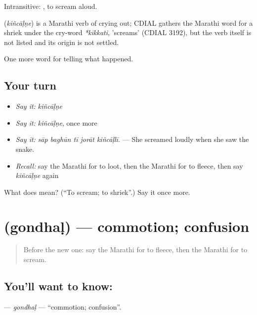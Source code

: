 Intransitive:  , to scream aloud.

\begin{cousinweb}
\textbf{} (\emph{kiñcāḷṇe}) is a Marathi verb of crying out; CDIAL gathers the Marathi word for a shriek under the cry-word \emph{*kīkkati}, 'screams' (CDIAL 3192), but the verb itself is not listed and its origin is not settled.
\end{cousinweb}

\begin{grammarlens}[title={What you've built}]
One more word for telling what happened.
\end{grammarlens}

\subsection*{Your turn}
\begin{itemize}
\raggedright
  \item \emph{Say it:} \emph{kiñcāḷṇe}
  \item \emph{Say it:} \emph{kiñcāḷṇe}, once more
  \item \emph{Say it:} \emph{sāp baghūn tī jorāt kiñcāḷlī.} — She screamed loudly when she saw the snake.
  \item \emph{Recall:} say the Marathi for to loot, then the Marathi for to fleece, then say \emph{kiñcāḷṇe} again
\end{itemize}

\begin{tcolorbox}[breakable,colback=teal!4,colframe=teal!35!black,title={Before you move on}]
What does  mean? (\textquotedblleft{}To scream; to shriek\textquotedblright{}.) Say it once more.
\end{tcolorbox}
\section[\texorpdfstring{\mr{गोंधळ} (gondhaḷ)}{गोंधळ (gondhaḷ)}]{ (gondhaḷ) — commotion; confusion}

\label{lesson:MR-C298-gondhal}



\begin{quote}
Before the new one: say the Marathi for to fleece, then the Marathi for to scream.
\end{quote}

\subsection*{You'll want to know: }
\textbf{} — \emph{gondhaḷ} — \textquotedblleft{}commotion; confusion\textquotedblright{}.

